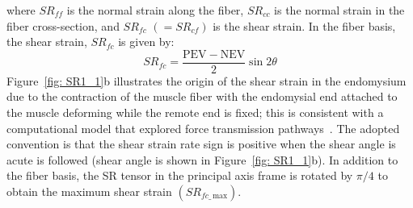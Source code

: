 where $SR_{ff}$ is the normal strain along the fiber, $SR_{cc}$ is the normal strain in the fiber cross-section, and $SR_{fc}$ $(=SR_{cf})$ is the shear strain. In the fiber basis, the shear strain, $SR_{fc}$ is given by:
\begin{equation}\label{eq: SR shear}
SR_{fc}=\dfrac{\mathrm{PEV}-\mathrm{NEV}}{2} \sin{2\theta}
\end{equation}
Figure~\ref{fig: SR1_1}b illustrates the origin of the shear strain in the endomysium due to the contraction of the muscle fiber with the endomysial end attached to the muscle deforming while the remote end is fixed; this is consistent with a computational model that explored force transmission pathways~\cite{RNS15}. 
The adopted convention is that the shear strain rate sign is positive when the shear angle is acute is followed (shear angle is shown in Figure~\ref{fig: SR1_1}b). 
In addition to the fiber basis, the SR tensor in the principal axis frame is rotated by $\pi/4 $ to obtain the maximum shear strain $(SR_{fc\_\,\mathrm{max}})$.

